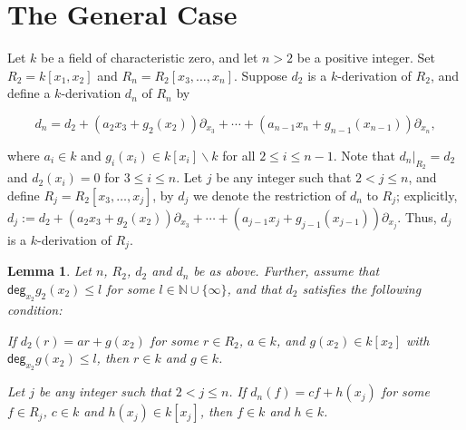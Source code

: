 \documentclass[12pt,reqno]{amsart}
\renewcommand{\deg}{\mathsf{deg}}
\renewcommand{\setminus}{\smallsetminus}
\renewcommand{\leq}{\leqslant}
\numberwithin{thm}{section}
\newtheorem{lem}[thm]{Lemma}
\theoremstyle{definition}
\numberwithin{equation}{thm}
\theoremstyle{plain}
\begin{document}
\section{The General Case}\label{The General Case}

	Let $k$ be a field of characteristic zero, and let $n>2$ be a positive integer. Set $R_2 = k[x_1,x_2]$ and $R_n = R_2[x_3, \ldots, x_n]$. 
Suppose $d_2$ is a $k$-derivation of $R_2$, and define a $k$-derivation $d_n$ of $R_n$ by

$$d_n = d_2 + (a_2 x_{3} + g_2(x_2))\partial_{x_{3}}+\cdots + (a_{n-1} x_n + g_{n-1}(x_{n-1}))\partial_{x_n},$$

where $a_i \in k$ and  $g_i(x_i) \in k[x_i] \setminus k$ for all $2 \leq i \le n-1$. Note that $d_n|_{R_2}=d_2$ and $d_2(x_i)=0$ for $3\leq i\leq n$. Let $j$ be any integer such that $2 <j \leq n$, and define $R_j = R_2[x_3, \ldots, x_j]$, by $d_j$ we denote the restriction of $d_n$ to $R_j$; explicitly, $d_j:=d_2 + (a_2 x_3 + g_2(x_2))\partial_{x_3} + \cdots + (a_{j-1} x_j + g_{j-1}(x_{j-1}))\partial_{x_j}$. Thus, $d_j$ is a $k$-derivation of $R_j.$

\begin{lem}\label{lemma no units}
  Let $n$, $R_2$, $d_2$ and $d_n$ be as above. Further, assume that $\deg_{x_2} g_2(x_2) \leq l$ for some $l \in \mathbb{N} \cup \{\infty\}$, and that $d_2$ satisfies the following condition:
	
	If $d_2(r) = a r + g(x_2)$ for some $r \in R_2$, $a \in k$, and $g(x_2) \in k[x_2]$ with $\deg_{x_2} g(x_2) \leq l$, 
	then $r \in k$ and $g \in k$.
    
 Let $j$ be any integer such that $2 <j \leq n$. If $d_n(f) = c f + h(x_j)$ for some $f\in R_j$, $c \in k$ and $h(x_j) \in k[x_j]$, then $f \in k$ and $h \in k$.
\end{lem}
\end{document}
